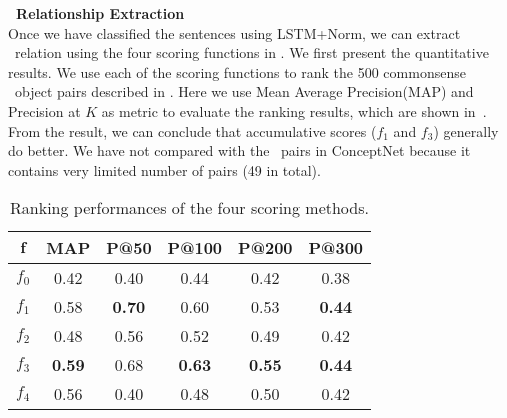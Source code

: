 \noindent
\textbf{\lnear\ Relationship Extraction}\\
Once we have classified the sentences using LSTM+Norm, we can extract \lnear\
relation using the four scoring functions in .
We first present the quantitative results. 
We use each of the scoring functions to 
rank the 500 commonsense \lnear\ object pairs described in . 
Here we use Mean Average Precision(MAP) and Precision at $K$ as metric 
to evaluate the ranking results, which are shown in~\tabref{tab:3m}.
From the result, we can conclude that accumulative scores ($f_1$ and $f_3$)
generally do better. We have not compared with the \lnear\ pairs in
ConceptNet because it contains very limited number of pairs (49 in total).
\begin{table}[th!]
\centering
\begin{tabular}{|c|c|c|c|c|c|}
\hline
$\mathbf{f}$	& \textbf{MAP} & \textbf{P@50} & \textbf{P@100}  &  \textbf{P@200}& \textbf{P@300}\\ \hline \hline
	$f_0$ & 0.42 & 0.40 & 0.44 & 0.42 & 0.38 \\ \hline
	$f_1$	& 0.58  & {\bf 0.70} & 0.60& 0.53 & {\bf 0.44}\\\hline
	$f_2$	& 0.48 & 0.56 & 0.52  & 0.49 & 0.42\\\hline
	$f_3$	& {\bf 0.59} & 0.68& {\bf 0.63} & {\bf 0.55} & {\bf 0.44}\\\hline
	$f_4$	& 0.56 & 0.40 & 0.48 & 0.50 & 0.42\\\hline
	\end{tabular}
\caption{Ranking performances of the four scoring methods.}
\label{tab:3m}
\end{table}

